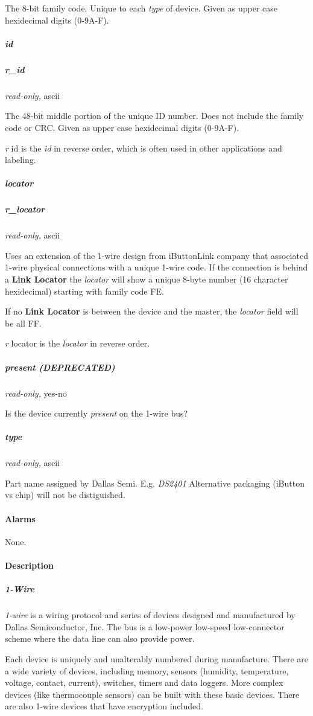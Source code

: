 The 8-bit family code. Unique to each \textit{type} of device. Given as upper case
hexidecimal digits (0-9A-F). 
\subparagraph*{id}
\subparagraph*{r\_id}\textit{read-only,} ascii 

The 48-bit middle portion of the unique ID number. Does not include the family
code or CRC. Given as upper case hexidecimal digits (0-9A-F). 

\textit{r} id is the \textit{id} in reverse order, which is often used in other applications
and labeling. 
\subparagraph*{locator}
\subparagraph*{r\_locator}\textit{read-only,} ascii 

Uses an extension of the 1-wire design from iButtonLink company that associated
1-wire physical connections with a unique 1-wire code. If the connection is
behind a \textbf{Link Locator} the \textit{locator} will show a unique 8-byte number (16 character
hexidecimal) starting with family code FE. 

If no \textbf{Link Locator} is between the device and the master, the \textit{locator} field
will be all FF. 

\textit{r} locator is the \textit{locator} in reverse order. 
\subparagraph*{present (DEPRECATED)}\textit{read-only,}
yes-no 

Is the device currently \textit{present} on the 1-wire bus? 
\subparagraph*{type}\textit{read-only,} ascii 

Part name assigned by Dallas Semi. E.g. \textit{DS2401} Alternative packaging (iButton
vs chip) will not be distiguished.  
\paragraph*{Alarms}
None. 
\paragraph*{Description}
          
\subparagraph*{1-Wire}\textit{1-wire}
 is a wiring protocol and series of devices designed and manufactured by
Dallas Semiconductor, Inc. The bus is a low-power low-speed low-connector scheme
where the data line can also provide power. 

Each device is uniquely and
unalterably numbered during manufacture. There are a wide variety of devices,
including memory, sensors (humidity, temperature, voltage, contact, current),
switches, timers and data loggers. More complex devices (like thermocouple
sensors) can be built with these basic devices. There are also 1-wire devices
that have encryption included. 

